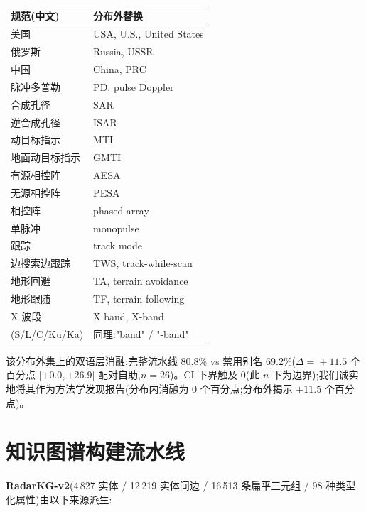 \documentclass[11pt,a4paper]{article}
\begin{document}
\begin{table}[h]
\centering\small
\begin{tabular}{l l}
\toprule
\textbf{规范(中文)} & \textbf{分布外替换} \\
\midrule
美国             & USA, U.S., United States \\
俄罗斯           & Russia, USSR \\
中国             & China, PRC \\
脉冲多普勒       & PD, pulse Doppler \\
合成孔径         & SAR \\
逆合成孔径       & ISAR \\
动目标指示       & MTI \\
地面动目标指示   & GMTI \\
有源相控阵       & AESA \\
无源相控阵       & PESA \\
相控阵           & phased array \\
单脉冲           & monopulse \\
跟踪             & track mode \\
边搜索边跟踪     & TWS, track-while-scan \\
地形回避         & TA, terrain avoidance \\
地形跟随         & TF, terrain following \\
X 波段           & X band, X-band \\
(S/L/C/Ku/Ka)    & 同理:"band" / "-band" \\
\bottomrule
\end{tabular}
\end{table}

该分布外集上的双语层消融:完整流水线 80.8\% vs 禁用别名 69.2\%($\Delta\!=\!+11.5$ 个百分点 [$+0.0, +26.9$] 配对自助,$n\!=\!26$)。CI 下界触及 0(此 $n$ 下为边界);我们诚实地将其作为方法学发现报告(分布内消融为 0 个百分点;分布外揭示 $+11.5$ 个百分点)。

\section{知识图谱构建流水线}
\label{app:kg}

\textbf{RadarKG-v2}(4\,827 实体 / 12\,219 实体间边 / 16\,513 条扁平三元组 / 98 种类型化属性)由以下来源派生:
\end{document}
